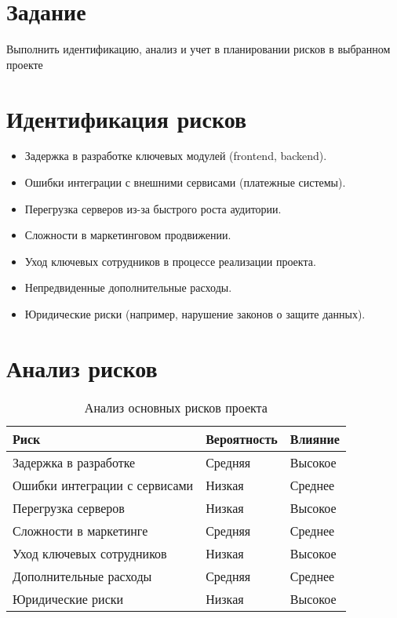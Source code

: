 \documentclass[14pt, russian]{matmex-diploma-custom}
\begin{document}

\maketitle

\section*{Задание}
Выполнить идентификацию, анализ и учет в планировании рисков в выбранном проекте

\section{Идентификация рисков}
\begin{itemize}
    \item Задержка в разработке ключевых модулей (frontend, backend).
    \item Ошибки интеграции с внешними сервисами (платежные системы).
    \item Перегрузка серверов из-за быстрого роста аудитории.
    \item Сложности в маркетинговом продвижении.
    \item Уход ключевых сотрудников в процессе реализации проекта.
    \item Непредвиденные дополнительные расходы.
    \item Юридические риски (например, нарушение законов о защите данных).
\end{itemize}

\section{Анализ рисков}

\begin{table}[h!]
    \centering
    \begin{tabular}{|p{7cm}|p{3cm}|p{3cm}|}
    \hline
    \textbf{Риск} & \textbf{Вероятность} & \textbf{Влияние} \\
    \hline
    Задержка в разработке & Средняя & Высокое \\
    \hline
    Ошибки интеграции с сервисами & Низкая & Среднее \\
    \hline
    Перегрузка серверов & Низкая & Высокое \\
    \hline
    Сложности в маркетинге & Средняя & Среднее \\
    \hline
    Уход ключевых сотрудников & Низкая & Высокое \\
    \hline
    Дополнительные расходы & Средняя & Среднее \\
    \hline
    Юридические риски & Низкая & Высокое \\
    \hline
    \end{tabular}
    \caption{Анализ основных рисков проекта}
    \end{table}
\end{document}
